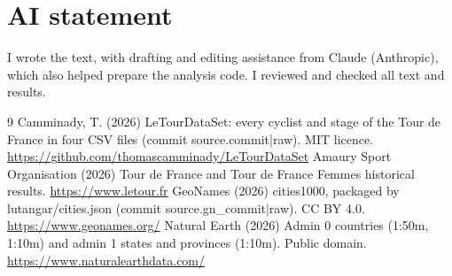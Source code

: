 \documentclass[11pt,a4paper]{article}
\begin{document}
\section*{AI statement}
I wrote the text, with drafting and editing assistance from Claude (Anthropic), which also helped prepare the analysis code. I reviewed and checked all text and results.

\begin{thebibliography}{9}
 Camminady, T. (2026) LeTourDataSet: every cyclist and stage of the Tour de France in four CSV files (commit {{source.commit|raw}}). MIT licence. \url{https://github.com/thomascamminady/LeTourDataSet}
 Amaury Sport Organisation (2026) Tour de France and Tour de France Femmes historical results. \url{https://www.letour.fr}
 GeoNames (2026) cities1000, packaged by lutangar/cities.json (commit {{source.gn_commit|raw}}). CC BY 4.0. \url{https://www.geonames.org/}
 Natural Earth (2026) Admin 0 countries (1:50m, 1:10m) and admin 1 states and provinces (1:10m). Public domain. \url{https://www.naturalearthdata.com/}
\end{thebibliography}
\end{document}
